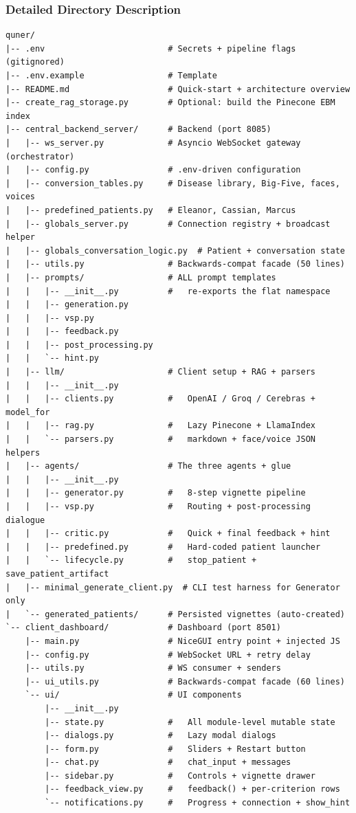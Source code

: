 \documentclass{article}
\begin{document}
\newpage
\subsubsection{Detailed Directory Description}

\begin{verbatim}
quner/
|-- .env                         # Secrets + pipeline flags (gitignored)
|-- .env.example                 # Template
|-- README.md                    # Quick-start + architecture overview
|-- create_rag_storage.py        # Optional: build the Pinecone EBM index
|-- central_backend_server/      # Backend (port 8085)
|   |-- ws_server.py             # Asyncio WebSocket gateway (orchestrator)
|   |-- config.py                # .env-driven configuration
|   |-- conversion_tables.py     # Disease library, Big-Five, faces, voices
|   |-- predefined_patients.py   # Eleanor, Cassian, Marcus
|   |-- globals_server.py        # Connection registry + broadcast helper
|   |-- globals_conversation_logic.py  # Patient + conversation state
|   |-- utils.py                 # Backwards-compat facade (50 lines)
|   |-- prompts/                 # ALL prompt templates
|   |   |-- __init__.py          #   re-exports the flat namespace
|   |   |-- generation.py
|   |   |-- vsp.py
|   |   |-- feedback.py
|   |   |-- post_processing.py
|   |   `-- hint.py
|   |-- llm/                     # Client setup + RAG + parsers
|   |   |-- __init__.py
|   |   |-- clients.py           #   OpenAI / Groq / Cerebras + model_for
|   |   |-- rag.py               #   Lazy Pinecone + LlamaIndex
|   |   `-- parsers.py           #   markdown + face/voice JSON helpers
|   |-- agents/                  # The three agents + glue
|   |   |-- __init__.py
|   |   |-- generator.py         #   8-step vignette pipeline
|   |   |-- vsp.py               #   Routing + post-processing dialogue
|   |   |-- critic.py            #   Quick + final feedback + hint
|   |   |-- predefined.py        #   Hard-coded patient launcher
|   |   `-- lifecycle.py         #   stop_patient + save_patient_artifact
|   |-- minimal_generate_client.py  # CLI test harness for Generator only
|   `-- generated_patients/      # Persisted vignettes (auto-created)
`-- client_dashboard/            # Dashboard (port 8501)
    |-- main.py                  # NiceGUI entry point + injected JS
    |-- config.py                # WebSocket URL + retry delay
    |-- utils.py                 # WS consumer + senders
    |-- ui_utils.py              # Backwards-compat facade (60 lines)
    `-- ui/                      # UI components
        |-- __init__.py
        |-- state.py             #   All module-level mutable state
        |-- dialogs.py           #   Lazy modal dialogs
        |-- form.py              #   Sliders + Restart button
        |-- chat.py              #   chat_input + messages
        |-- sidebar.py           #   Controls + vignette drawer
        |-- feedback_view.py     #   feedback() + per-criterion rows
        `-- notifications.py     #   Progress + connection + show_hint
\end{verbatim}
\end{document}

